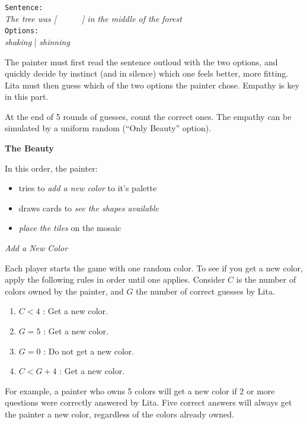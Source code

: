 \documentclass[twocolumn]{article}
\newcommand{\lvl}[1]{\vspace{0.5cm}\Large{\textbf{#1}}\vspace{0.2cm}}
\newcommand{\sublvl}[1]{\vspace{0.3cm}\large{\textit{#1}}\vspace{0.1cm}}
\begin{document}
\begin{centering}
\texttt{Sentence:}\\
\textit{The tree was [\ \ \ \ \ \ ] in the middle of the forest}\\
\texttt{Options:}\\
\textit{shaking} | \textit{shinning}\\
\end{centering}
\vspace{0.5cm}

The painter must first read the sentence outloud with the two options, and quickly decide by instinct (and in silence) which one feels better, more fitting. Lita must then guess which of the two options the painter chose. Empathy is key in this part.

At the end of 5 rounds of guesses, count the correct ones. The empathy can be simulated by a uniform random (``Only Beauty'' option).

\lvl{The Beauty}

In this order, the painter:
\begin{itemize}
 \item tries to \textit{add a new color} to it's palette
 \item draws cards to \textit{see the shapes available}
 \item \textit{place the tiles} on the mosaic
\end{itemize}


\sublvl{Add a New Color}

Each player starts the game with one random color. To see if you get a new color, apply the following rules in order until one applies. Consider $C$ is the number of colors owned by the painter, and $G$ the number of correct guesses by Lita. 

\begin{enumerate}
 \item $C<4$ : Get a new color.
 \item $G=5$ : Get a new color.
 \item $G=0$ : Do not get a new color.
 \item $C<G+4$ : Get a new color. 
\end{enumerate}
For example, a painter who owns 5 colors will get a new color if 2 or more questions were correctly answered by Lita. Five correct answers will always get the painter a new color, regardless of the colors already owned.
\end{document}

